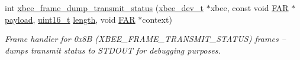 \begin{DoxyCompactItemize}
\item 
int \hyperlink{group__xbee__wpan_gaa750c530910a7d8324ba5579ee7fcb57}{xbee\+\_\+frame\+\_\+dump\+\_\+transmit\+\_\+status} (\hyperlink{structxbee__dev__t}{xbee\+\_\+dev\+\_\+t} $\ast$xbee, const void \hyperlink{group__hal_gaef060b3456fdcc093a7210a762d5f2ed}{F\+AR} $\ast$\hyperlink{group__zcl_gacb1403989580c30b5cac60f347c5d6ab}{payload}, \hyperlink{group__hal__dos_ga5a8b2dc9e45a9ee81a94ef304fb62505}{uint16\+\_\+t} \hyperlink{group__zdo_gab2b3adeb2a67e656ff030b56727fd0ac}{length}, void \hyperlink{group__hal_gaef060b3456fdcc093a7210a762d5f2ed}{F\+AR} $\ast$context)
\begin{DoxyCompactList}\small\item\em Frame handler for 0x8B (X\+B\+E\+E\+\_\+\+F\+R\+A\+M\+E\+\_\+\+T\+R\+A\+N\+S\+M\+I\+T\+\_\+\+S\+T\+A\+T\+US) frames -- dumps transmit status to S\+T\+D\+O\+UT for debugging purposes. \end{DoxyCompactList}\end{DoxyCompactItemize}
